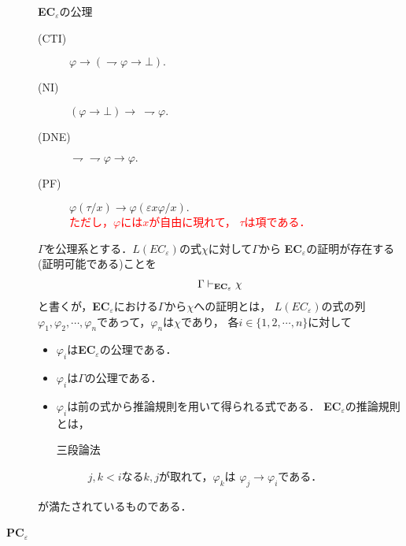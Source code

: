 \begin{description}
\begin{itembox}[l]{{\bf EC}${}_{\varepsilon}$の公理}
\begin{description}
			\item[(CTI)] $\varphi \rightarrow (\rightharpoondown \varphi \rightarrow \bot).$
			
			\item[(NI)] $(\varphi \rightarrow \bot) \rightarrow\ \rightharpoondown \varphi.$
			\item[(DNE)] $\rightharpoondown \rightharpoondown \varphi \rightarrow \varphi.$
			\item[(PF)] $\varphi(\tau/x) \rightarrow \varphi(\varepsilon x \varphi/x).$
				\\ \textcolor{red}{ただし，$\varphi$には$x$が自由に現れて，
				$\tau$は項である．}
		\end{description}
	\end{itembox}
	
	$\Gamma$を公理系とする．$L(EC_{\varepsilon})$の式$\chi$に対して$\Gamma$から
	{\bf EC}${}_{\varepsilon}$の証明が存在する(証明可能である)ことを
	\begin{align}
		\Gamma \vdash_{{\scriptsize \mbox{{\bf EC}${}_{\varepsilon}$}}} \chi
	\end{align}
	と書くが，{\bf EC}${}_{\varepsilon}$における$\Gamma$から$\chi$への証明とは，
	$L(EC_{\varepsilon})$の式の列$\varphi_{1},\varphi_{2},
	\cdots,\varphi_{n}$であって，$\varphi_{n}$は$\chi$であり，
	各$i \in \{1,2,\cdots,n\}$に対して
	\begin{itemize}
		\item $\varphi_{i}$は{\bf EC}${}_{\varepsilon}$の公理である．
		\item $\varphi_{i}$は$\Gamma$の公理である．
		\item $\varphi_{i}$は前の式から推論規則を用いて得られる式である．
			{\bf EC}${}_{\varepsilon}$の推論規則とは，
			\begin{description}
			\item[三段論法]
				$j,k < i$なる$k,j$が取れて，$\varphi_{k}$は
				$\varphi_{j} \rightarrow \varphi_{i}$である．
		\end{description} 
	\end{itemize}
	が満たされているものである．
	
	\item[{\bf PC}${}_{\varepsilon}$]\mbox{}
	

\end{description}

